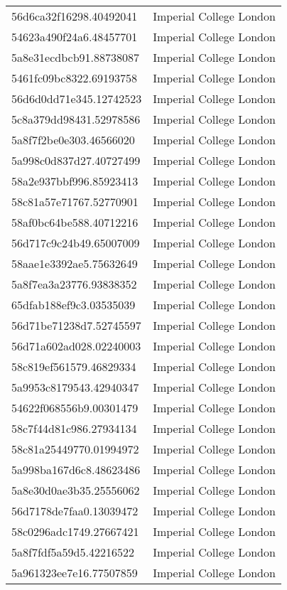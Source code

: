 \begin{tabular}{ll}
56d6ca32f16298.40492041 & Imperial College London \\
54623a490f24a6.48457701 & Imperial College London \\
5a8e31ecdbcb91.88738087 & Imperial College London \\
5461fc09bc8322.69193758 & Imperial College London \\
56d6d0dd71e345.12742523 & Imperial College London \\
5c8a379dd98431.52978586 & Imperial College London \\
5a8f7f2be0e303.46566020 & Imperial College London \\
5a998c0d837d27.40727499 & Imperial College London \\
58a2e937bbf996.85923413 & Imperial College London \\
58c81a57e71767.52770901 & Imperial College London \\
58af0bc64be588.40712216 & Imperial College London \\
56d717c9c24b49.65007009 & Imperial College London \\
58aae1e3392ae5.75632649 & Imperial College London \\
5a8f7ea3a23776.93838352 & Imperial College London \\
65dfab188ef9c3.03535039 & Imperial College London \\
56d71be71238d7.52745597 & Imperial College London \\
56d71a602ad028.02240003 & Imperial College London \\
58c819ef561579.46829334 & Imperial College London \\
5a9953c8179543.42940347 & Imperial College London \\
54622f068556b9.00301479 & Imperial College London \\
58c7f44d81c986.27934134 & Imperial College London \\
58c81a25449770.01994972 & Imperial College London \\
5a998ba167d6c8.48623486 & Imperial College London \\
5a8e30d0ae3b35.25556062 & Imperial College London \\
56d7178de7faa0.13039472 & Imperial College London \\
58c0296adc1749.27667421 & Imperial College London \\
5a8f7fdf5a59d5.42216522 & Imperial College London \\
5a961323ee7e16.77507859 & Imperial College London \\

\end{tabular}
